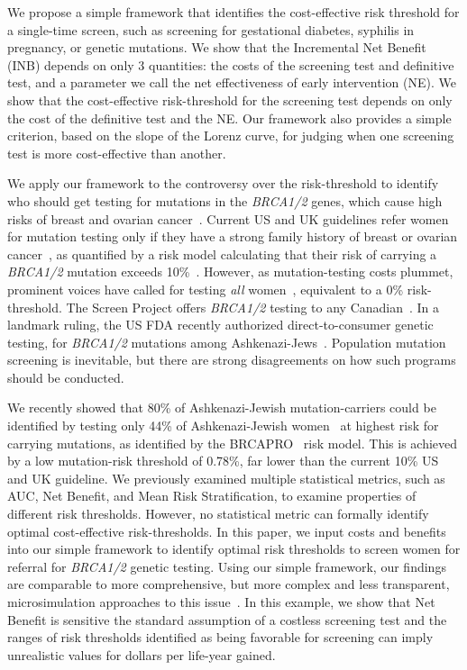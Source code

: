 \documentclass[11pt, letterpaper]{article}
\begin{document}
We propose a simple framework that identifies the cost-effective risk threshold for a single-time screen, such as screening for gestational diabetes, syphilis in pregnancy, or genetic mutations.  We show that the Incremental Net Benefit (INB) depends on only 3 quantities: the costs of the screening test and definitive test, and a parameter we call the net effectiveness of early intervention (NE).  We show that the cost-effective risk-threshold for the screening test depends on only the cost of the definitive test and the NE.  Our framework also provides a simple criterion, based on the slope of the Lorenz curve, for judging when one screening test is more cost-effective than another.

We apply our framework to the controversy over the risk-threshold to identify who should get testing for mutations in the \textit{BRCA1/2} genes, which cause high risks of breast and ovarian cancer~\citep{Kuchenbaecker2017}.   Current US and UK guidelines refer women for mutation testing only if they have a strong family history of breast or ovarian cancer~\citep{Moyer2014}, as quantified by a risk model calculating that their risk of carrying a \textit{BRCA1/2} mutation exceeds 10\%~\citep{NICE2017}.  However, as mutation-testing costs plummet, prominent voices have called for testing \textit{all} women~\citep{King2014}, equivalent to a 0\% risk-threshold.   The Screen Project offers \textit{BRCA1/2} testing to any Canadian~\citep{TheScreenProject2017}.  In a landmark ruling, the US FDA recently authorized direct-to-consumer genetic testing, for \textit{BRCA1/2} mutations among Ashkenazi-Jews~\citep{Rabin2018}.  Population mutation screening is inevitable, but there are strong disagreements on how such programs should be conducted.

We recently showed that 80\% of Ashkenazi-Jewish mutation-carriers could be identified by testing only 44\% of Ashkenazi-Jewish women~\citep{Best2019} at highest risk for carrying mutations, as identified by the BRCAPRO~\citep{Parmigiani1998} risk model.  This is achieved by a low mutation-risk threshold of 0.78\%, far lower than the current 10\% US and UK guideline.  We previously examined multiple statistical metrics, such as AUC, Net Benefit, and Mean Risk Stratification, to examine properties of different risk thresholds.  However, no statistical metric can formally identify optimal cost-effective risk-thresholds.  In this paper, we input costs and benefits into our simple framework to identify optimal risk thresholds to screen women for referral for \textit{BRCA1/2} genetic testing.  Using our simple framework, our findings are comparable to more comprehensive, but more complex and less transparent, microsimulation approaches to this issue~\cite{Long2015,Manchanda2015}.   In this example, we show that Net Benefit is sensitive the standard assumption of a costless screening test and the ranges of risk thresholds identified as being favorable for screening can imply unrealistic values for dollars per life-year gained.
\end{document}
